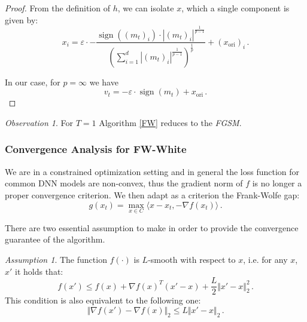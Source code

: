 \documentclass[10pt,twocolumn,letterpaper, english]{article}
\newcommand{\sign}{\mathop{\mathrm{sign}}}
\theoremstyle{definition}
\theoremstyle{plain}
\theoremstyle{plain}
\theoremstyle{plain}
\theoremstyle{plain}
\theoremstyle{remark}
\newtheorem{osservazione}{Observation}[section]
\theoremstyle{remark}
\newtheorem{ass}{Assumption}[subsection]
\theoremstyle{definition}
\theoremstyle{definition}
\theoremstyle{definition}
\theoremstyle{definition}
\renewcommand{\epsilon}{\varepsilon}
\begin{document}
\begin{proof}
From the definition of $h$, we can isolate $x$, which a single component is given by:
\begin{equation*}
      x_i=\epsilon \cdot - \frac{\sign((m_t)_i)\cdot \left | (m_t)_i \right |^{\frac{1}{p-1}}}{(\sum_{i=1}^d \left | (m_t)_i \right |^{\frac{1}{p-1}} )^{\frac{1}{p}}} + (x_{\text{ori}})_i\,.
\end{equation*}


In our case, for $p= \infty$ we have
\begin{equation*}
    v_t = - \epsilon \cdot \sign(m_t) + x_{\text{ori}}\,.
\end{equation*}
\end{proof}

\begin{osservazione}
For $T=1$ Algorithm \ref{FW} reduces to the \textit{FGSM}.
\end{osservazione}

\subsubsection{Convergence Analysis for FW-White}

We are in a constrained optimization setting and in general the loss function for common DNN models are non-convex, thus the gradient norm of $f$ is no longer a proper convergence criterion. We then adapt as a criterion the Frank-Wolfe gap:
\begin{equation} \label{gap}
    g(x_t)= \max_{x \in C} \langle  x-x_t, - \nabla f(x_t) \rangle \,.
\end{equation}

There are two essential assumption to make in order to provide the convergence guarantee of the algorithm.
\begin{ass}\label{ass1}
The function $f(\cdot)$ is $L$-smooth with respect to $x$, i.e. for any $x$, $x'$ it holds that:
\begin{equation*}
    f(x') \le f(x) + \nabla f(x)^T (x' - x) + \frac{L}{2} \Vert x' -x \Vert_{2}^2\,.
\end{equation*}
This condition is also equivalent to the following one: 
\begin{equation*}
    \Vert \nabla f(x') - \nabla f(x) \Vert_2 \le L \Vert x'-x \Vert_2\,.
\end{equation*}
\end{ass}
\end{document}
